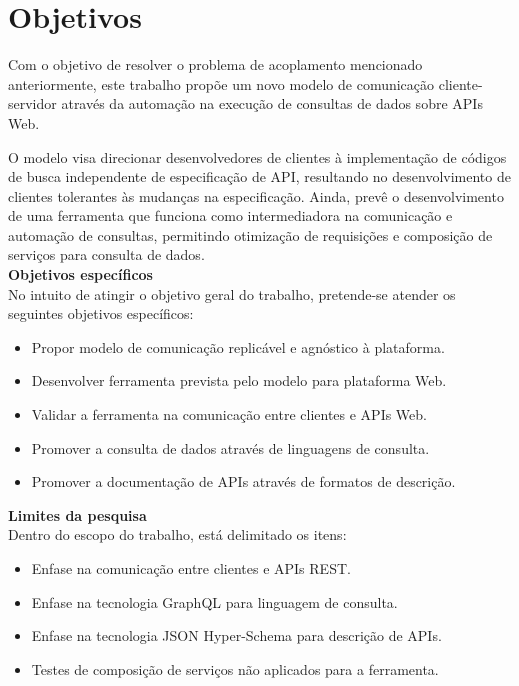 \section[Objetivos]{Objetivos}

Com o objetivo de resolver o problema de acoplamento mencionado anteriormente, este trabalho propõe um novo modelo de comunicação cliente-servidor através da automação na execução de consultas de dados sobre APIs Web.

O modelo visa direcionar desenvolvedores de clientes à implementação de códigos de busca independente de especificação de API, resultando no desenvolvimento de clientes tolerantes às mudanças na especificação. Ainda, prevê o desenvolvimento de uma ferramenta que funciona como intermediadora na comunicação e automação de consultas, permitindo otimização de requisições e composição de serviços para consulta de dados. \\

\textbf{Objetivos específicos} \\

No intuito de atingir o objetivo geral do trabalho, pretende-se atender os seguintes objetivos específicos:

\begin{itemize}
\item Propor modelo de comunicação replicável e agnóstico à plataforma.
\item Desenvolver ferramenta prevista pelo modelo para plataforma Web.
\item Validar a ferramenta na comunicação entre clientes e APIs Web.
\item Promover a consulta de dados através de linguagens de consulta.
\item Promover a documentação de APIs através de formatos de descrição. \\
\end{itemize}

\textbf{Limites da pesquisa} \\

Dentro do escopo do trabalho, está delimitado os itens:

\begin{itemize}
\item Enfase na comunicação entre clientes e APIs REST.
\item Enfase na tecnologia GraphQL para linguagem de consulta.
\item Enfase na tecnologia JSON Hyper-Schema para descrição de APIs.
\item Testes de composição de serviços não aplicados para a ferramenta.
\end{itemize}

